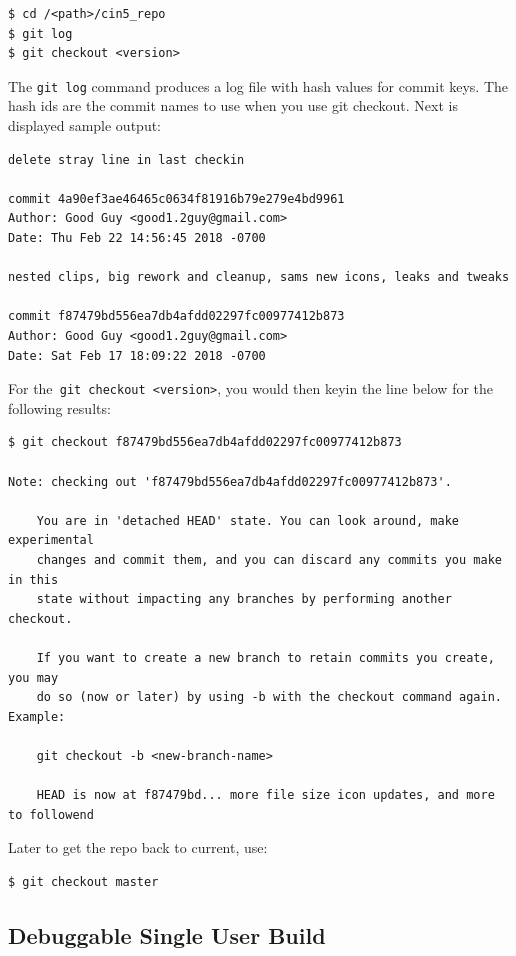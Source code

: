\begin{lstlisting}[numbers=none]
$ cd /<path>/cin5_repo
$ git log
$ git checkout <version>
\end{lstlisting}


The \texttt{git log} command produces a log file with hash values for commit keys.  The hash ids are the commit names to use when you use git checkout.  
Next is displayed sample output:


\begin{lstlisting}[numbers=none]
delete stray line in last checkin

commit 4a90ef3ae46465c0634f81916b79e279e4bd9961
Author: Good Guy <good1.2guy@gmail.com>
Date: Thu Feb 22 14:56:45 2018 -0700

nested clips, big rework and cleanup, sams new icons, leaks and tweaks

commit f87479bd556ea7db4afdd02297fc00977412b873
Author: Good Guy <good1.2guy@gmail.com>
Date: Sat Feb 17 18:09:22 2018 -0700
\end{lstlisting}

For the\texttt{ git checkout <version>}, you would then keyin the line below for the following results:

\begin{lstlisting}[numbers=none]
$ git checkout f87479bd556ea7db4afdd02297fc00977412b873

Note: checking out 'f87479bd556ea7db4afdd02297fc00977412b873'.

	You are in 'detached HEAD' state. You can look around, make experimental
	changes and commit them, and you can discard any commits you make in this
	state without impacting any branches by performing another checkout.

	If you want to create a new branch to retain commits you create, you may
	do so (now or later) by using -b with the checkout command again. Example:

  	git checkout -b <new-branch-name>

	HEAD is now at f87479bd... more file size icon updates, and more to followend
\end{lstlisting}

Later to get the repo back to current, use:    
\begin{lstlisting}[numbers=none]
$ git checkout master
\end{lstlisting}


\subsection{Debuggable Single User Build}%
\label{sub:debuggable_single_user_build}


